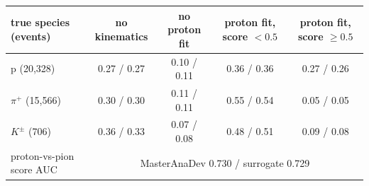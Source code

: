 \begin{tabular}{lcccc}
\toprule
true species (events) & no kinematics & no proton fit & proton fit, score $<0.5$ & proton fit, score $\geq 0.5$ \\
\midrule
p (20,328) & 0.27 / 0.27 & 0.10 / 0.11 & 0.36 / 0.36 & 0.27 / 0.26 \\
$\pi^+$ (15,566) & 0.30 / 0.30 & 0.11 / 0.11 & 0.55 / 0.54 & 0.05 / 0.05 \\
$K^\pm$ (706) & 0.36 / 0.33 & 0.07 / 0.08 & 0.48 / 0.51 & 0.09 / 0.08 \\
\midrule
proton-vs-pion score AUC & \multicolumn{4}{c}{MasterAnaDev 0.730 / surrogate 0.729} \\
\bottomrule
\end{tabular}
